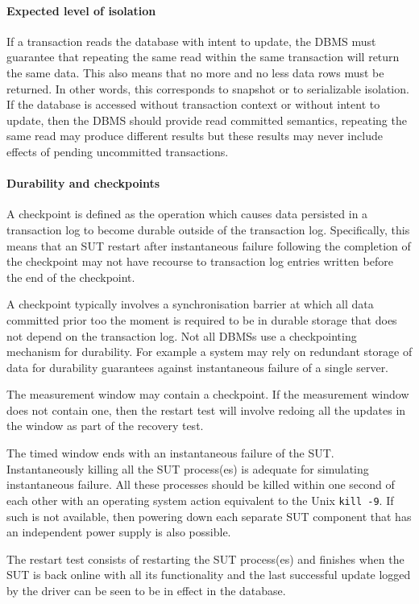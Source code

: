 \paragraph{Expected level of isolation}
If a transaction reads the database with intent to update, the DBMS must guarantee that repeating the same read within the same transaction will return the same data. This also means that no more and no less data rows must be returned. In other words, this corresponds to snapshot or to serializable isolation. If the database is accessed without transaction context or without intent to update, then the DBMS should provide read committed semantics, \eg repeating the same read may produce different results but these results may never include effects of pending uncommitted transactions.

\paragraph{Durability and checkpoints}

A checkpoint is defined as the operation which causes data persisted in a transaction log to become durable outside of the transaction log. Specifically, this means that an SUT restart after instantaneous failure following the completion of the checkpoint may not have recourse to transaction log entries written before the end of the checkpoint.

A checkpoint typically involves a synchronisation barrier at which all data committed prior too the moment is required to be in durable storage that does not depend on the transaction log.
Not all DBMSs use a checkpointing mechanism for durability. For example a system may rely on redundant storage of data for durability guarantees against instantaneous failure of a single server.

The measurement window may contain a checkpoint. If the measurement window does not contain one, then the restart test will involve redoing all the updates in the window as part of the recovery test.

The timed window ends with an instantaneous failure of the SUT. Instantaneously killing all the SUT process(es) is adequate for simulating instantaneous failure. All these processes should be killed within one second of each other with an operating system action equivalent to the Unix \verb+kill -9+. If such is not available, then powering down each separate SUT component that has an independent power supply is also possible.

The restart test consists of restarting the SUT process(es) and finishes when the SUT is back online with all its functionality and the last successful update logged by the driver can be seen to be in effect in the database.

